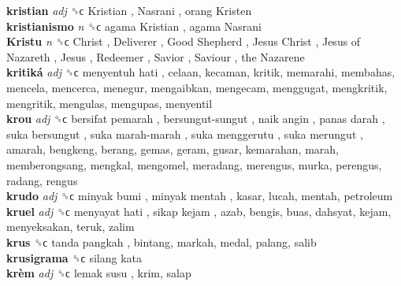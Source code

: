 \textbf{kristian} \emph{adj}  ␝ϲ   Kristian ,  Nasrani ,  orang Kristen   \\
\textbf{kristianismo} \emph{n}  ␝ϲ   agama Kristian ,  agama Nasrani   \\
\textbf{Kristu} \emph{n}  ␝ϲ   Christ ,  Deliverer ,  Good Shepherd ,  Jesus Christ ,  Jesus of Nazareth ,  Jesus ,  Redeemer ,  Savior ,  Saviour ,  the Nazarene   \\
\textbf{kritiká} \emph{adj}  ␝ϲ   menyentuh hati , celaan, kecaman, kritik, memarahi, membahas, mencela, mencerca, menegur, mengaibkan, mengecam, menggugat, mengkritik, mengritik, mengulas, mengupas, menyentil  \\
\textbf{krou} \emph{adj}  ␝ϲ   bersifat pemarah ,  bersungut-sungut ,  naik angin ,  panas darah ,  suka bersungut ,  suka marah-marah ,  suka menggerutu ,  suka merungut , amarah, bengkeng, berang, gemas, geram, gusar, kemarahan, marah, memberongsang, mengkal, mengomel, meradang, merengus, murka, perengus, radang, rengus  \\
\textbf{krudo} \emph{adj}  ␝ϲ   minyak bumi ,  minyak mentah , kasar, lucah, mentah, petroleum  \\
\textbf{kruel} \emph{adj}  ␝ϲ   menyayat hati ,  sikap kejam , azab, bengis, buas, dahsyat, kejam, menyeksakan, teruk, zalim  \\
\textbf{krus} ␝ϲ   tanda pangkah , bintang, markah, medal, palang, salib  \\
\textbf{krusigrama} ␝ϲ   silang kata   \\
\textbf{krèm} \emph{adj}  ␝ϲ   lemak susu , krim, salap  \\
